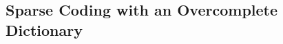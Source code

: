 \documentclass[../../book-main.tex]{subfiles}
\begin{document}
%

\subsection{Sparse Coding with an Overcomplete Dictionary} 
\end{document}
